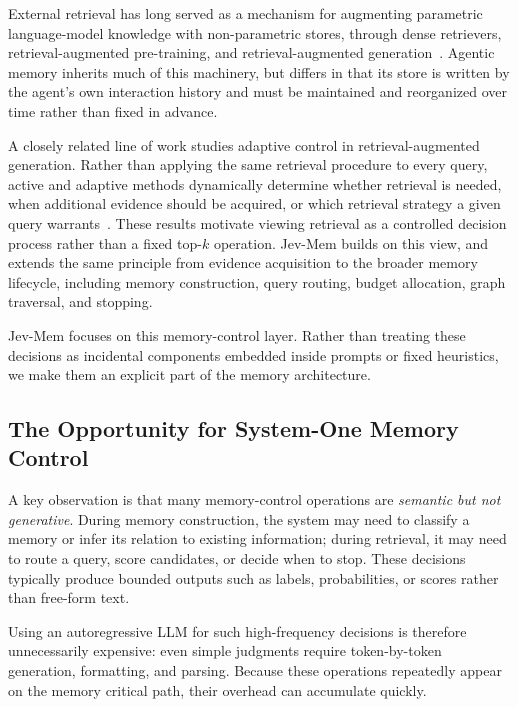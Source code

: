 \documentclass[11pt]{article}
\begin{document}
External retrieval has long served as a mechanism for augmenting parametric language-model knowledge with non-parametric stores, through dense retrievers, retrieval-augmented pre-training, and retrieval-augmented generation~\citep{karpukhin2020dpr, guu2020realm, lewis2020retrieval, borgeaud2022retro, izacard2023atlas}. Agentic memory inherits much of this machinery, but differs in that its store is written by the agent's own interaction history and must be maintained and reorganized over time rather than fixed in advance.

A closely related line of work studies adaptive control in retrieval-augmented generation. Rather than applying the same retrieval procedure to every query, active and adaptive methods dynamically determine whether retrieval is needed, when additional evidence should be acquired, or which retrieval strategy a given query warrants~\citep{trivedi2023ircot, jiang2023flare, asai2024selfrag, jeong2024adaptiverag}. These results motivate viewing retrieval as a controlled decision process rather than a fixed top-$k$ operation. Jev-Mem builds on this view, and extends the same principle from evidence acquisition to the broader memory lifecycle, including memory construction, query routing, budget allocation, graph traversal, and stopping.

Jev-Mem focuses on this memory-control layer. Rather than treating these decisions as incidental components embedded inside prompts or fixed heuristics, we make them an explicit part of the memory architecture.


\subsection{The Opportunity for System-One Memory Control}
A key observation is that many memory-control operations are \emph{semantic but not generative}. During memory construction, the system may need to classify a memory or infer its relation to existing information; during retrieval, it may need to route a query, score candidates, or decide when to stop. These decisions typically produce bounded outputs such as labels, probabilities, or scores rather than free-form text.

Using an autoregressive LLM for such high-frequency decisions is therefore unnecessarily expensive: even simple judgments require token-by-token generation, formatting, and parsing. Because these operations repeatedly appear on the memory critical path, their overhead can accumulate quickly.
\end{document}
